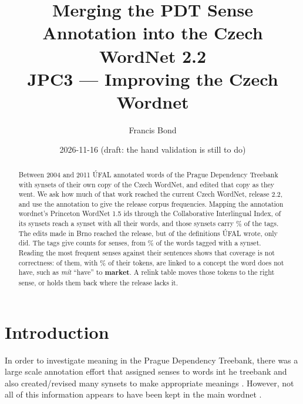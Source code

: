 \documentclass[a4paper,12pt]{article}
\title{Merging the PDT Sense Annotation into the Czech WordNet 2.2\\
  \large JPC3 --- Improving the Czech Wordnet}
\author{Francis Bond}
\date{2026-11-16 (draft: the hand validation is still to do)}
\begin{document}
\maketitle

\begin{abstract}
  Between 2004 and 2011 ÚFAL annotated  words of the
  Prague Dependency Treebank with synsets of their own copy of the Czech
  WordNet, and edited that copy as they went.  We ask how much of that work
  reached the current Czech WordNet, release 2.2, and use the annotation
  to give the release corpus frequencies.  Mapping the annotation
  wordnet's Princeton WordNet 1.5 ids through the Collaborative
  Interlingual Index,  of its
   synsets reach a synset with all their words,
  and those synsets carry \% of the tags.  The edits made in Brno reached the release, but of the
   definitions ÚFAL wrote, only
   did.
  The tags give counts for  senses, from
  \% of the words tagged with a synset.  Reading
  the  most frequent senses against their
  sentences shows that coverage is not correctness:
   of them, with
  \% of their tokens, are linked to a concept
  the word does not have, such as \textit{mít} ``have'' to
  \textbf{market}.  A relink table moves those tokens to the right sense,
  or holds them back where the release lacks it.
\end{abstract}

\section{Introduction}

In order to investigate meaning in the Prague Dependency Treebank,
there was a large scale annotation effort
\citep{hajic-etal2004,bejcek-etal2006,pdt-wsd2011} that assigned senses
to words int he treebank and also created/revised many synsets to make
appropriate meanings \cite{cwn19pdt2011}.  However, not all of this
information appears to have been kept in the main wordnet
\citep{rambousek-etal2017}.
\end{document}
